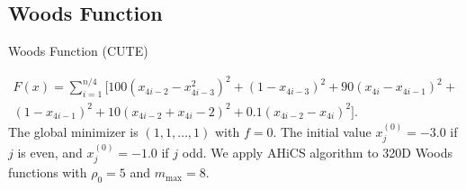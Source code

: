 \documentclass{beamer}
\begin{document}
\subsection{Woods Function}
\begin{frame}{Woods Function (CUTE)}

\footnotesize{
\begin{equation*}
	\begin{aligned}
		F(x) = \sum^{n/4}_{i=1} \Big[100(x_{4i-2}-x^2_{4i-3})^2 +
		(1-x_{4i-3})^2 + 90(x_{4i}-x_{4i-1})^2 +
		\\
		(1-x_{4i-1})^2 + 10(x_{4i-2}+x_{4i}-2)^2 +
		0.1(x_{4i-2}-x_{4i})^2
		\Big].
	\end{aligned}
\end{equation*}
}
\footnotesize{
\noindent The global minimizer is $(1,1,\dots,1)$ with $f=0$.
The initial value $x_j^{(0)}=-3.0$ if
$j$ is even, and  $x_j^{(0)}=-1.0$ if $j$ odd.
We apply AHiCS algorithm to 320D Woods functions with
$\rho_0 = 5$ and $m_{\max}=8$.
}
%
\begin{figure}[!htbp]
	\centering

\end{figure}
\end{frame}
\end{document}

